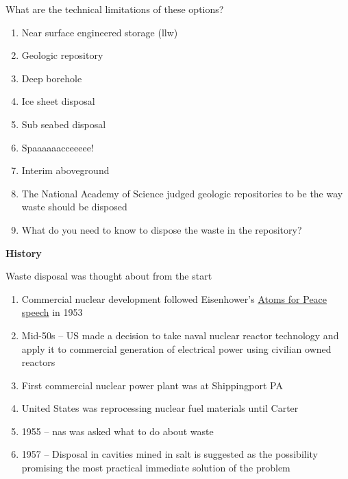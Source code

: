 \documentclass[aspectratio=1610,pdftex,dvipsnames,compress,xcolor={dvipsnames}]{beamer}
\newcommand{\acf}{\acrfull} %
\newcommand{\acs}{\acrshort} %
\begin{document}
\addtocounter{framenumber}{-1} 
\begin{frame}{What are the technical limitations of these options?}
    \begin{enumerate}[series=outerlist,topsep=0pt,itemsep=11pt,leftmargin=*,label=(\arabic*)]
        \item[]Near surface engineered storage (\acs{llw})
        \item[]Geologic repository 
        \item[]Deep borehole
        \item[]Ice sheet disposal
        \item[]Sub seabed disposal
        \item[]Spaaaaaacceeeee!
        \item[]Interim aboveground
        \item[]The National Academy of Science judged geologic repositories to be the way waste should be disposed
        \item[]What do you need to know to dispose the waste in the repository?
    \end{enumerate}
\end{frame}


\begin{frame}[plain]{}
    \centering\LARGE\textbf{History}
\end{frame}


\addtocounter{framenumber}{-1} 
\begin{frame}{Waste disposal was thought about from the start}
    \begin{enumerate}[series=outerlist,topsep=0pt,itemsep=21pt,leftmargin=*,label=(\arabic*)]
        \item[]Commercial nuclear development followed Eisenhower's \href{https://youtu.be/2B8R-umE0s0}{Atoms for Peace speech} in 1953
        \item[]Mid-50s -- US made a decision to take naval nuclear reactor technology and apply it to commercial generation of electrical power using civilian owned reactors
        \item[]First commercial nuclear power plant was at Shippingport PA  
        \item[]United States was reprocessing nuclear fuel materials until Carter
        \item[]1955 -- \acf{nas} was asked what to do about waste 
        \item[]1957 -- Disposal in cavities mined in salt is suggested as the possibility promising the most practical immediate solution of the problem
    \end{enumerate}
\end{frame}
\end{document}
